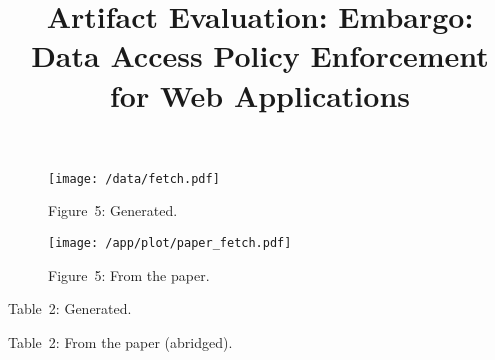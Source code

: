 \documentclass{article}
\title{Artifact Evaluation: Embargo: Data Access Policy Enforcement for Web Applications}
\author{}
\date{}
\begin{document}
\maketitle

\begin{figure}\centering
    \texttt{[image: /data/fetch.pdf]}
    \caption*{Figure~5: Generated.}
\end{figure}

\begin{figure}\centering
    \texttt{[image: /app/plot/paper\_fetch.pdf]}
    \caption*{Figure~5: From the paper.}
\end{figure}

\begin{table}
\caption*{Table~2: Generated.}
\small\centering

\end{table}

\begin{table}
\caption*{Table~2: From the paper (abridged).}
\small\centering

\end{table}
\end{document}

